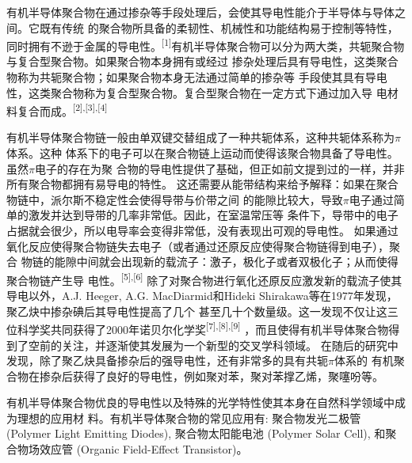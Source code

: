\documentclass[12pt,]{report}
\begin{document}
有机半导体聚合物在通过掺杂等手段处理后，会使其导电性能介于半导体与导体之间。它既有传统
的聚合物所具备的柔韧性、机械性和功能结构易于控制等特性，同时拥有不逊于金属的导电性。\textsuperscript{{[}1{]}}有机半导体聚合物可以分为两大类，共轭聚合物与复合型聚合物。如果聚合物本身拥有或经过
掺杂处理后具有导电性，这类聚合物称为共轭聚合物；如果聚合物本身无法通过简单的掺杂等
手段使其具有导电性，这类聚合物称为复合型聚合物。复合型聚合物在一定方式下通过加入导
电材料复合而成。\textsuperscript{{[}2{]},{[}3{]},{[}4{]}}

有机半导体聚合物链一般由单双键交替组成了一种共轭体系，这种共轭体系称为\(\pi\)体系。这种
体系下的电子可以在聚合物链上运动而使得该聚合物具备了导电性。虽然\(\pi\)电子的存在为聚
合物的导电性提供了基础，但正如前文提到过的一样，并非所有聚合物都拥有易导电的特性。
这还需要从能带结构来给予解释：如果在聚合物链中，派尔斯不稳定性会使得导带与价带之间
的能隙比较大，导致\(\pi\)电子通过简单的激发并达到导带的几率非常低。因此，在室温常压等
条件下，导带中的电子占据就会很少，所以电导率会变得非常低，没有表现出可观的导电性。
如果通过氧化反应使得聚合物链失去电子（或者通过还原反应使得聚合物链得到电子），聚合
物链的能隙中间就会出现新的载流子：激子，极化子或者双极化子；从而使得聚合物链产生导
电性。\textsuperscript{{[}5{]},{[}6{]}}
除了对聚合物进行氧化还原反应激发新的载流子使其导电以外，A.J. Heeger,
A.G. MacDiarmid和Hideki
Shirakawa等在1977年发现，聚乙炔中掺杂碘后其导电性提高了几个
甚至几十个数量级。这一发现不仅让这三位科学奖共同获得了2000年诺贝尔化学奖\textsuperscript{{[}7{]},{[}8{]},{[}9{]}}
，而且使得有机半导体聚合物得到了空前的关注，并逐渐使其发展为一个新型的交叉学科领域。
在随后的研究中发现，除了聚乙炔具备掺杂后的强导电性，还有非常多的具有共轭\(\pi\)体系的
有机聚合物在掺杂后获得了良好的导电性，例如聚对苯，聚对苯撑乙烯，聚噻吩等。

有机半导体聚合物优良的导电性以及特殊的光学特性使其本身在自然科学领域中成为理想的应用材
料。有机半导体聚合物的常见应用有: 聚合物发光二极管 (Polymer Light
Emitting Diodes), 聚合物太阳能电池 (Polymer Solar Cell),
和聚合物场效应管 (Organic Field-Effect Transistor)。
\end{document}
